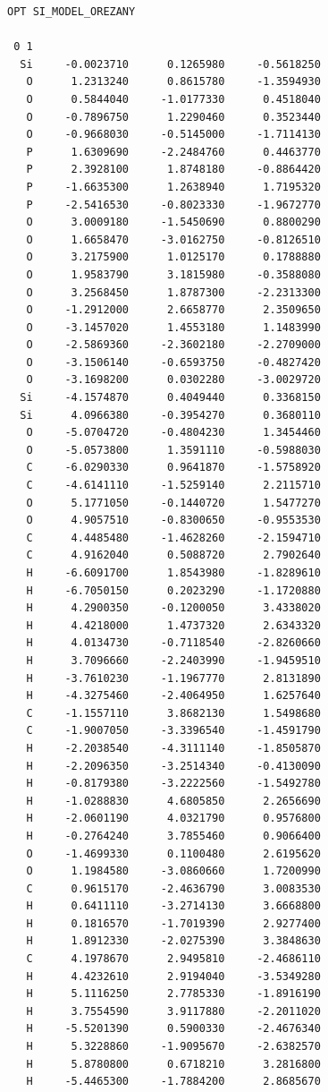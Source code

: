 \documentclass[
  digital, %
  table,   %
  lof,     %
  lot,     %
  oneside,
]{fithesis3}
\begin{document}
 \begin{lstlisting}[frame=single, caption={\ce{Si(Si2P2O9(CH3)4)2} },label=DescriptiveLabel]
 OPT SI_MODEL_OREZANY

 0 1
  Si     -0.0023710      0.1265980     -0.5618250
   O      1.2313240      0.8615780     -1.3594930
   O      0.5844040     -1.0177330      0.4518040
   O     -0.7896750      1.2290460      0.3523440
   O     -0.9668030     -0.5145000     -1.7114130
   P      1.6309690     -2.2484760      0.4463770
   P      2.3928100      1.8748180     -0.8864420
   P     -1.6635300      1.2638940      1.7195320
   P     -2.5416530     -0.8023330     -1.9672770
   O      3.0009180     -1.5450690      0.8800290
   O      1.6658470     -3.0162750     -0.8126510
   O      3.2175900      1.0125170      0.1788880
   O      1.9583790      3.1815980     -0.3588080
   O      3.2568450      1.8787300     -2.2313300
   O     -1.2912000      2.6658770      2.3509650
   O     -3.1457020      1.4553180      1.1483990
   O     -2.5869360     -2.3602180     -2.2709000
   O     -3.1506140     -0.6593750     -0.4827420
   O     -3.1698200      0.0302280     -3.0029720
  Si     -4.1574870      0.4049440      0.3368150
  Si      4.0966380     -0.3954270      0.3680110
   O     -5.0704720     -0.4804230      1.3454460
   O     -5.0573800      1.3591110     -0.5988030
   C     -6.0290330      0.9641870     -1.5758920
   C     -4.6141110     -1.5259140      2.2115710
   O      5.1771050     -0.1440720      1.5477270
   O      4.9057510     -0.8300650     -0.9553530
   C      4.4485480     -1.4628260     -2.1594710
   C      4.9162040      0.5088720      2.7902640
   H     -6.6091700      1.8543980     -1.8289610
   H     -6.7050150      0.2023290     -1.1720880
   H      4.2900350     -0.1200050      3.4338020
   H      4.4218000      1.4737320      2.6343320
   H      4.0134730     -0.7118540     -2.8260660
   H      3.7096660     -2.2403990     -1.9459510
   H     -3.7610230     -1.1967770      2.8131890
   H     -4.3275460     -2.4064950      1.6257640
   C     -1.1557110      3.8682130      1.5498680
   C     -1.9007050     -3.3396540     -1.4591790
   H     -2.2038540     -4.3111140     -1.8505870
   H     -2.2096350     -3.2514340     -0.4130090
   H     -0.8179380     -3.2222560     -1.5492780
   H     -1.0288830      4.6805850      2.2656690
   H     -2.0601190      4.0321790      0.9576800
   H     -0.2764240      3.7855460      0.9066400
   O     -1.4699330      0.1100480      2.6195620
   O      1.1984580     -3.0860660      1.7200990
   C      0.9615170     -2.4636790      3.0083530
   H      0.6411110     -3.2714130      3.6668800
   H      0.1816570     -1.7019390      2.9277400
   H      1.8912330     -2.0275390      3.3848630
   C      4.1978670      2.9495810     -2.4686110
   H      4.4232610      2.9194040     -3.5349280
   H      5.1116250      2.7785330     -1.8916190
   H      3.7554590      3.9117880     -2.2011020
   H     -5.5201390      0.5900330     -2.4676340
   H      5.3228860     -1.9095670     -2.6382570
   H      5.8780800      0.6718210      3.2816800
   H     -5.4465300     -1.7884200      2.8685670

 \end{lstlisting}
\end{document}
